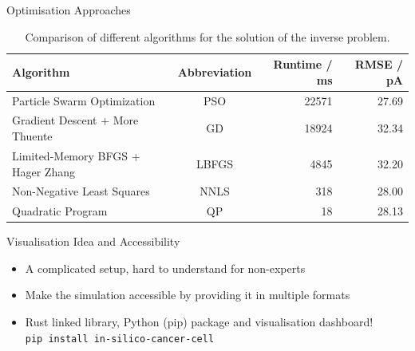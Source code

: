 \documentclass[aspectratio=169, hyperref={colorlinks=true}]{beamer}
\begin{document}
  \begin{frame}{Optimisation Approaches}
    \scriptsize
    \begin{table}
      \begin{tabular}{lcrr}
        \hline
        \textbf{Algorithm}                          & \textbf{Abbreviation} & \textbf{Runtime} / ms & \textbf{RMSE} / pA \\
        \hline
        Particle Swarm Optimization                 & PSO                   & 22571                 & 27.69              \\
        Gradient Descent + More Thuente             & GD                    & 18924                 & 32.34              \\
        Limited-Memory BFGS + Hager Zhang           & LBFGS                 & 4845                  & 32.20              \\
        Non-Negative Least Squares \cite{1997-nnls} & NNLS                  & 318                   & 28.00              \\
        Quadratic Program                           & QP                    & 18                    & 28.13              \\
        \hline
      \end{tabular}
      \caption{Comparison of different algorithms for the solution of the inverse problem.}
    \end{table}
  \end{frame}

  \begin{frame}{Visualisation Idea and Accessibility}
    \begin{itemize}
      \item A complicated setup, hard to understand for non-experts
      \item Make the simulation accessible by providing it in multiple formats
      \item Rust linked library, Python (pip) package and visualisation dashboard! \\
            \texttt{pip install in-silico-cancer-cell}
    \end{itemize}
  \end{frame}
\end{document}
